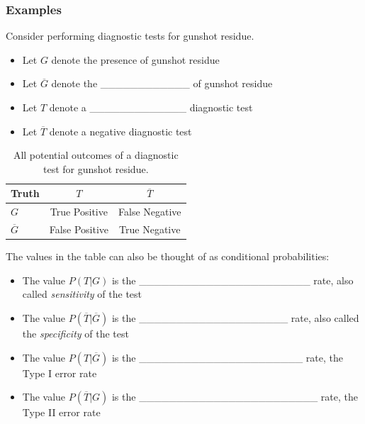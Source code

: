 \documentclass[]{book}
\providecommand{\tightlist}{%
  \setlength{\itemsep}{0pt}\setlength{\parskip}{0pt}}
\theoremstyle{definition}
\theoremstyle{definition}
\theoremstyle{remark}
\begin{document}
\subsubsection{Examples}\label{examples-2}

Consider performing diagnostic tests for gunshot residue.

\begin{itemize}
\tightlist
\item
  Let \(G\) denote the presence of gunshot residue \vspace{.1in}
\item
  Let \(\overline{G}\) denote the \_\_\_\_\_\_\_\_\_\_\_\_ of gunshot
  residue \vspace{.1in}
\item
  Let \(T\) denote a \_\_\_\_\_\_\_\_\_\_\_\_\_ diagnostic test
  \vspace{.1in}
\item
  Let \(\overline{T}\) denote a negative diagnostic test
\end{itemize}

\begin{table}[h]
\centering
\begin{tabular}{|l|c|c|}
\hline
Truth & $T$ & $\overline{T}$ \\
\hline
$G$ & True Positive & False Negative \\
\hline
$\overline{G}$ & False Positive & True Negative \\
\hline
\end{tabular}
\caption{\label{tab:bayesex} All potential outcomes of a diagnostic test for gunshot residue.}
\end{table}

The values in the table can also be thought of as conditional
probabilities:

\begin{itemize}
\tightlist
\item
  The value \(P(T|G)\) is the
  \_\_\_\_\_\_\_\_\_\_\_\_\_\_\_\_\_\_\_\_\_\_\_ rate, also called
  \emph{sensitivity} of the test \vspace{.1in}
\item
  The value \(P(\overline{T}|\overline{G})\) is the
  \_\_\_\_\_\_\_\_\_\_\_\_\_\_\_\_\_\_\_\_ rate, also called the
  \emph{specificity} of the test \vspace{.1in}
\item
  The value \(P(T|\overline{G})\) is the
  \_\_\_\_\_\_\_\_\_\_\_\_\_\_\_\_\_\_\_\_\_\_ rate, the Type I error
  rate \vspace{.1in}
\item
  The value \(P(\overline{T}|G)\) is the
  \_\_\_\_\_\_\_\_\_\_\_\_\_\_\_\_\_\_\_\_\_\_\_\_ rate, the Type II
  error rate
\end{itemize}
\end{document}

